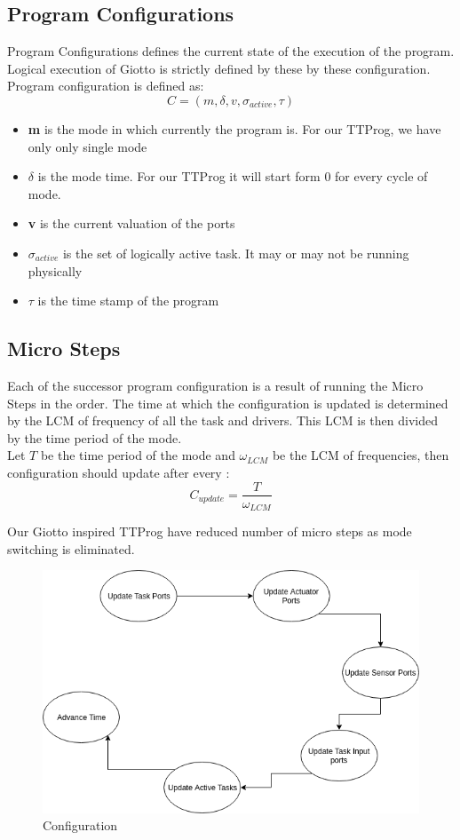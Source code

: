 \documentclass[16pt]{report}
\begin{document}
\subsection{Program Configurations}
Program Configurations defines the current state of the execution of the program. Logical execution of Giotto is strictly defined by these by these configuration. Program configuration is defined as:
\begin{equation}
    C = (m,\delta, v, \sigma_{active},\tau)
\end{equation}
\begin{itemize}
    \item \textbf{m} is the mode in which currently the program is. For our TTProg, we have only only single mode
    \item \textbf{$\delta$} is the mode time. For our TTProg it will start form 0 for every cycle of mode.
    \item \textbf{v} is the current valuation of the ports
    \item \textbf{$\sigma_{active}$} is the set of logically active task. It may or may not be running physically
    \item \textbf{$\tau$} is the time stamp of the program
\end{itemize}

\subsection{Micro Steps}
Each of the successor program configuration is a result of running the Micro Steps in the order. The time at which the configuration is updated is determined by the LCM of frequency of all the task and drivers. This LCM is then divided by the time period of the mode.\\
Let $T$ be the time period of the mode and $\omega_{LCM}$ be the LCM of frequencies, then configuration should update after every :
\begin{equation}
  C_{update} =  \frac{T}{\omega_{LCM}}
\end{equation}

Our Giotto inspired TTProg have reduced number of micro steps as mode switching is eliminated. 
\begin{figure}[H]
\centering
\includegraphics[width=\linewidth]{18microSteps.png}
\caption{Configuration}
\end{figure}
\end{document}
